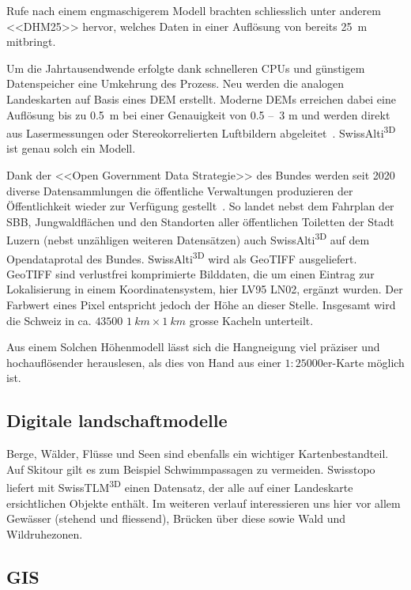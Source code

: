 Rufe nach einem engmaschigerem Modell brachten schliesslich unter anderem <<DHM25>> hervor, welches Daten in einer Auflösung von bereits \qty{25}{m} mitbringt.~\cite{swisstopohistdem}

Um die Jahrtausendwende erfolgte dank schnelleren CPUs und günstigem Datenspeicher eine Umkehrung des Prozess. Neu werden die analogen Landeskarten auf Basis eines DEM erstellt. Moderne DEMs erreichen dabei eine Auflösung bis zu \qty{0.5}{m} bei einer Genauigkeit von 0.5 --~3 \unit{m} und werden direkt aus Lasermessungen oder Stereokorrelierten Luftbildern abgeleitet~\cite{alti3dprod}. SwissAlti\textsuperscript{3D} ist genau solch ein Modell.

Dank der <<Open Government Data Strategie>> des Bundes werden seit 2020 diverse Datensammlungen die öffentliche Verwaltungen produzieren der Öffentlichkeit wieder zur Verfügung gestellt~\cite{opendataswiss}.
So landet nebst dem Fahrplan der SBB, Jungwaldflächen und den Standorten aller öffentlichen Toiletten der Stadt Luzern (nebst unzähligen weiteren Datensätzen) auch  SwissAlti\textsuperscript{3D} auf dem Opendataprotal des Bundes.
SwissAlti\textsuperscript{3D} wird als GeoTIFF ausgeliefert. GeoTIFF sind verlustfrei komprimierte Bilddaten, die um einen Eintrag zur Lokalisierung in einem Koordinatensystem, hier LV95 LN02, ergänzt wurden. Der Farbwert eines Pixel entspricht jedoch der Höhe an dieser Stelle. Insgesamt wird die Schweiz in ca. $43500$ $\qty{1}{km} \times \qty{1}{km}$ grosse Kacheln unterteilt.~\cite{alti3dprod} 

Aus einem Solchen Höhenmodell lässt sich die Hangneigung viel präziser und hochauflösender herauslesen, als dies von Hand aus einer $1:25000$er-Karte möglich ist.

\subsection{Digitale landschaftmodelle}

Berge, Wälder, Flüsse und Seen sind ebenfalls ein wichtiger Kartenbestandteil. Auf Skitour gilt es zum Beispiel Schwimmpassagen zu vermeiden. Swisstopo liefert mit SwissTLM\textsuperscript{3D} einen Datensatz, der alle auf einer Landeskarte ersichtlichen Objekte enthält. Im weiteren verlauf interessieren uns hier vor allem Gewässer (stehend und fliessend), Brücken über diese sowie Wald und Wildruhezonen.

\subsection{GIS}\label{sec:gis}


